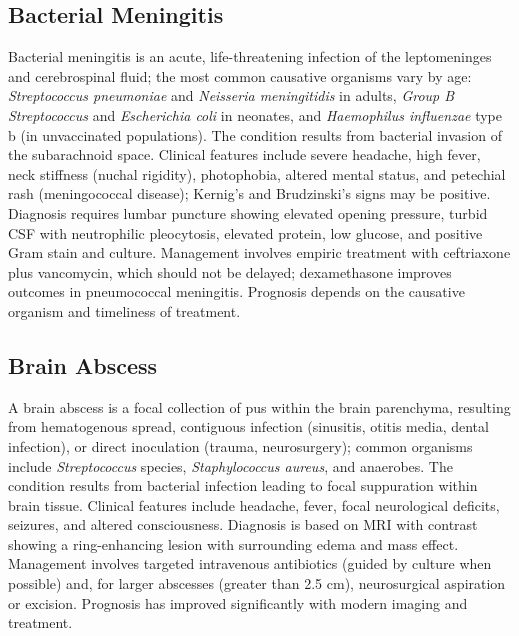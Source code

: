 \subsection{Bacterial Meningitis}
\label{sec:Bacterial Meningitis}
Bacterial meningitis is an acute, life-threatening infection of the leptomeninges and cerebrospinal fluid; the most common causative organisms vary by age: \textit{Streptococcus pneumoniae} and \textit{Neisseria meningitidis} in adults, \textit{Group B Streptococcus} and \textit{Escherichia coli} in neonates, and \textit{Haemophilus influenzae} type b (in unvaccinated populations). The condition results from bacterial invasion of the subarachnoid space. Clinical features include severe headache, high fever, neck stiffness (nuchal rigidity), photophobia, altered mental status, and petechial rash (meningococcal disease); Kernig's and Brudzinski's signs may be positive. Diagnosis requires lumbar puncture showing elevated opening pressure, turbid CSF with neutrophilic pleocytosis, elevated protein, low glucose, and positive Gram stain and culture. Management involves empiric treatment with ceftriaxone plus vancomycin, which should not be delayed; dexamethasone improves outcomes in pneumococcal meningitis. Prognosis depends on the causative organism and timeliness of treatment.

\subsection{Brain Abscess}
\label{sec:Brain Abscess}
A brain abscess is a focal collection of pus within the brain parenchyma, resulting from hematogenous spread, contiguous infection (sinusitis, otitis media, dental infection), or direct inoculation (trauma, neurosurgery); common organisms include \textit{Streptococcus} species, \textit{Staphylococcus aureus}, and anaerobes. The condition results from bacterial infection leading to focal suppuration within brain tissue. Clinical features include headache, fever, focal neurological deficits, seizures, and altered consciousness. Diagnosis is based on MRI with contrast showing a ring-enhancing lesion with surrounding edema and mass effect. Management involves targeted intravenous antibiotics (guided by culture when possible) and, for larger abscesses (greater than 2.5 cm), neurosurgical aspiration or excision. Prognosis has improved significantly with modern imaging and treatment.

